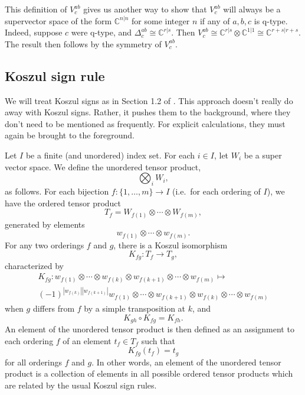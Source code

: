 \documentclass[12pt,a4paper]{article}
\newcommand{\tp}{\otimes}
\newcommand{\cc}{\mathbb{C}}
\newcommand\be            {\begin{equation}}
\newcommand\ee            {\end{equation}}
\newcommand{\kw}[1]{{\color{kwcolor}\footnotesize{(KW) #1}}}
\begin{document}
This definition of $V^{ab}_c$ gives us another way to show that $V^{ab}_c$ will always be a supervector space of the form $\cc^{n|n}$ for some integer $n$ if any of $a,b,c$ is q-type. 
Indeed, suppose $c$ were q-type, and $\Delta^{ab}_c \cong \cc^{r|s}$. 
Then $V^{ab}_c \cong \cc^{r|s} \tp \cc^{1|1} \cong \cc^{r+s|r+s}$. 
The result then follows by the symmetry of $V^{ab}_c$. 




\subsection{Koszul sign rule} \label{koszul_signs}

We will treat Koszul signs as in Section 1.2 of \cite{deligne1999}.
This approach doesn't really do away with Koszul signs.
Rather, it pushes them to the background, where they don't need to be mentioned as frequently.
For explicit calculations, they must again be brought to the foreground.

Let $I$ be a finite (and unordered) index set.
For each $i\in I$, let $W_i$ be a super vector space.
We define the unordered tensor product,
\be
	\bigotimes_i W_i ,
\ee
as follows.
For each bijection $f: \{1, \ldots,m\} \to I$ (i.e.\ for each ordering of $I$),
we have the ordered tensor product
\be
	T_f = W_{f(1)}\otimes\cdots\otimes W_{f(m)} ,
\ee
generated by elements
\be
	w_{f(1)}\otimes\cdots\otimes w_{f(m)}.
\ee
For any two orderings $f$ and $g$, there is a Koszul isomorphism
\be
	K_{fg} : T_f \to T_g ,
\ee
characterized by
\begin{multline}
	K_{fg} : w_{f(1)}\otimes\cdots\otimes w_{f(k)} \otimes w_{f(k+1)} \otimes \cdots \otimes w_{f(m)} \mapsto \\
				(-1)^{|w_{f(k)}||w_{f(k+1)}|} w_{f(1)}\otimes\cdots\otimes w_{f(k+1)} \otimes w_{f(k)} \otimes \cdots \otimes w_{f(m)}
\end{multline}
when $g$ differs from $f$ by a simple transposition at $k$, and
\be
	K_{gh} \circ K_{fg} = K_{fh} .
\ee
An element of the unordered tensor product is then defined as an assignment to each ordering $f$ of an element $t_f\in T_f$
such that
\be
	K_{fg}(t_f) = t_g
\ee
for all orderings $f$ and $g$.
In other words, an element of the unordered tensor product is a collection of elements in all 
possible ordered tensor products which are related by the usual Koszul sign rules.
\end{document}
